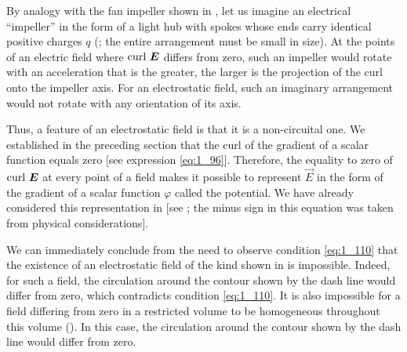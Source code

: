 By analogy with the fan impeller shown in , let us imagine an electrical ``impeller'' in the form of a light hub with spokes whose ends carry identical positive charges $q$ (; the entire arrangement must be small in size). At the points of an electric field where $\text{curl~}\boldsymbol{E}$ differs from zero, such an impeller would rotate with an acceleration that is the greater, the larger is the projection of the curl onto the impeller axis. For an electrostatic field, such an imaginary arrangement would not rotate with any orientation of its axis.

Thus, a feature of an electrostatic field is that it is a non-circuital one. We established in the preceding section that the curl of the gradient of a scalar function equals zero [see expression \eqref{eq:1_96}]. Therefore, the equality to zero of $\text{curl~}\boldsymbol{E}$ at every point of a field makes it possible to represent $\vec{E}$ in the form of the gradient of a scalar function $\varphi$ called the potential. We have already considered this representation in  [see ; the minus sign in this equation was taken from physical considerations].

We can immediately conclude from the need to observe condition \eqref{eq:1_110} that the existence of an electrostatic field of the kind shown in  is impossible. Indeed, for such a field, the circulation around the contour shown by the dash line would differ from zero, which contradicts condition \eqref{eq:1_110}. It is also impossible for a field differing from zero in a restricted volume to be homogeneous throughout this volume (). In this case, the circulation around the contour shown by the dash line would differ from zero.

